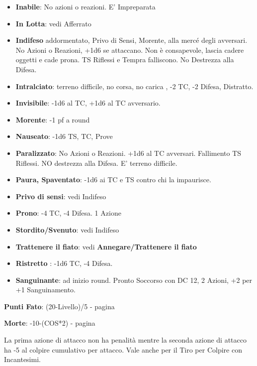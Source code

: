 \documentclass[landscape,10pt,a4paper]{article}
\begin{document}
\begin{multicols}{3}
\begin{dmbox}[title=Condizioni]
\begin{itemize}[leftmargin=0.5cm,itemsep=-1pt,parsep=0pt]
\item \textbf{Inabile}: No azioni o reazioni. E' Impreparata
\item \textbf{In Lotta}: vedi Afferrato
\item \textbf{Indifeso} addormentato, Privo di Sensi, Morente, alla mercé degli avversari. No Azioni o Reazioni, +1d6 se attaccano. Non è consapevole, lascia cadere oggetti e cade prona. TS Riflessi e Tempra falliscono. No Destrezza alla Difesa.
\item \textbf{Intralciato}: terreno difficile, no corsa, no carica , -2 TC, -2 Difesa, Distratto.
\item \textbf{Invisibile}: -1d6 al TC, +1d6 al TC avversario.
\item \textbf{Morente}: -1 pf a round
\item \textbf{Nauseato}: -1d6 TS, TC, Prove
\item \textbf{Paralizzato}: No Azioni o Reazioni. +1d6 al TC avversari. Fallimento TS Riflessi. NO destrezza alla Difesa. E' terreno difficile.
\item \textbf{Paura, Spaventato}: -1d6 ai TC e TS contro chi la impaurisce.
\item \textbf{Privo di sensi}: vedi Indifeso
\item \textbf{Prono}: -4 TC, -4 Difesa. 1 Azione
\item \textbf{Stordito/Svenuto}: vedi Indifeso
\item \textbf{Trattenere il fiato}: vedi \textbf{Annegare/Trattenere il fiato}
\item \textbf{Ristretto} : -1d6 TC, -4 Difesa.
\item \textbf{Sanguinante}: ad inizio round. Pronto Soccorso con DC 12, 2 Azioni, +2 per +1 Sanguinamento.

\end{itemize}

\end{dmbox}

\begin{mybluebox}\textbf{Punti Fato}: (20-Livello)/5 - pagina \pageref{puntifato}\end{mybluebox}

\begin{mybluebox}\textbf{Morte}: -10-(COS*2) - pagina \pageref{morire}\end{mybluebox}

\begin{dmbox}[title=Attacchi Multipli - pagina \pageref{attacchimultiplimischia}]
	La prima azione di attacco non ha penalità mentre la seconda azione di attacco ha -5 al colpire cumulativo per attacco. Vale anche per il Tiro per Colpire con Incantesimi.
\end{dmbox}


\end{multicols}
\end{document}
